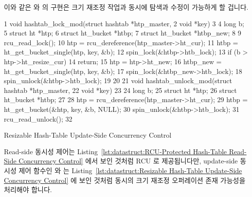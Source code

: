 이와 같은  와  의 구현은 크기
재조정 작업과 동시에 탐색과 수정이 가능하게 할 겁니다.

\begin{listing}[tb]
{ \scriptsize
\begin{verbbox}
 1 void hashtab_lock_mod(struct hashtab *htp_master,
 2                       void *key)
 3 {
 4   long b;
 5   struct ht *htp;
 6   struct ht_bucket *htbp;
 7   struct ht_bucket *htbp_new;
 8 
 9   rcu_read_lock();
10   htp = rcu_dereference(htp_master->ht_cur);
11   htbp = ht_get_bucket_single(htp, key, &b);
12   spin_lock(&htbp->htb_lock);
13   if (b > htp->ht_resize_cur)
14     return;
15   htp = htp->ht_new;
16   htbp_new = ht_get_bucket_single(htp, key, &b);
17   spin_lock(&htbp_new->htb_lock);
18   spin_unlock(&htbp->htb_lock);
19 }
20 
21 void hashtab_unlock_mod(struct hashtab *htp_master,
22                         void *key)
23 {
24   long b;
25   struct ht *htp;
26   struct ht_bucket *htbp;
27 
28   htp = rcu_dereference(htp_master->ht_cur);
29   htbp = ht_get_bucket(&htp, key, &b, NULL);
30   spin_unlock(&htbp->htb_lock);
31   rcu_read_unlock();
32 }
\end{verbbox}
}
\centering
\theverbbox
\caption{Resizable Hash-Table Update-Side Concurrency Control}
\label{lst:datastruct:Resizable Hash-Table Update-Side Concurrency Control}
\end{listing}

Read-side 동시성 제어는
Listing~\ref{lst:datastruct:RCU-Protected Hash-Table Read-Side Concurrency Control}
에서 보인 것처럼 RCU 로 제공됩니다만, update-side 동시성 제어 함수인
 와  는
Listing~\ref{lst:datastruct:Resizable Hash-Table Update-Side Concurrency Control}
에 보인 것처럼 동시의 크기 재조정 오퍼레이션 존재 가능성을 처리해야 합니다.

